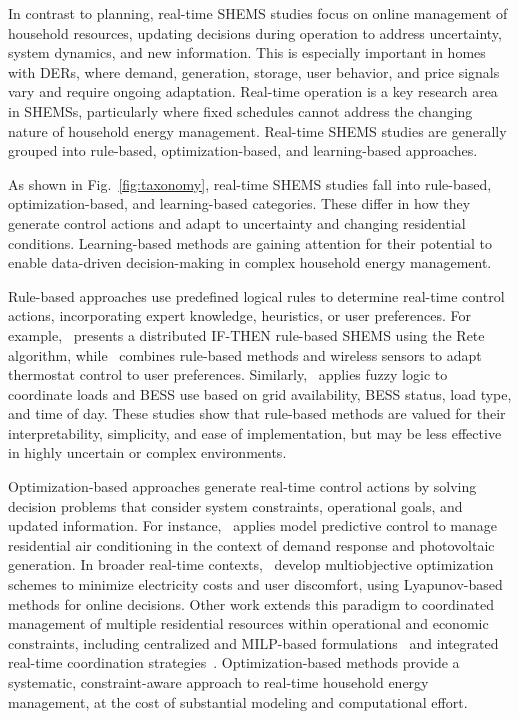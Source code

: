 \documentclass[preprint,12pt, 3p]{elsarticle}
\begin{document}
In contrast to planning, real-time \gls{SHEMS} studies focus on online management of household resources, updating decisions during operation to address uncertainty, system dynamics, and new information. This is especially important in homes with \glspl{DER}, where demand, generation, storage, user behavior, and price signals vary and require ongoing adaptation. Real-time operation is a key research area in \glspl{SHEMS}, particularly where fixed schedules cannot address the changing nature of household energy management. Real-time \gls{SHEMS} studies are generally grouped into rule-based, optimization-based, and learning-based approaches.

As shown in Fig.~\ref{fig:taxonomy}, real-time \gls{SHEMS} studies fall into rule-based, optimization-based, and learning-based categories. These differ in how they generate control actions and adapt to uncertainty and changing residential conditions. Learning-based methods are gaining attention for their potential to enable data-driven decision-making in complex household energy management.

Rule-based approaches use predefined logical rules to determine real-time control actions, incorporating expert knowledge, heuristics, or user preferences. For example,~\cite{kawakami2014evaluation-5b7} presents a distributed IF-THEN rule-based \gls{SHEMS} using the Rete algorithm, while~\cite{keshtkar2016adaptive-e08} combines rule-based methods and wireless sensors to adapt thermostat control to user preferences. Similarly,~\cite{krishna2018fuzzy-71b} applies fuzzy logic to coordinate loads and \gls{BESS} use based on grid availability, \gls{BESS} status, load type, and time of day. These studies show that rule-based methods are valued for their interpretability, simplicity, and ease of implementation, but may be less effective in highly uncertain or complex environments.

Optimization-based approaches generate real-time control actions by solving decision problems that consider system constraints, operational goals, and updated information. For instance,~\cite{godina2018model-dd4} applies model predictive control to manage residential air conditioning in the context of demand response and photovoltaic generation. In broader real-time contexts,~\cite{paul2020real-time-2b8,chatterjee2023multi-objective-ef1} develop multiobjective optimization schemes to minimize electricity costs and user discomfort, using Lyapunov-based methods for online decisions. Other work extends this paradigm to coordinated management of multiple residential resources within operational and economic constraints, including centralized and MILP-based formulations~\cite{seal2023centralized-90d,gomes2023milp-based-c2e} and integrated real-time coordination strategies~\cite{tifoura2025home-d26,teng2025integrating-1fd}. Optimization-based methods provide a systematic, constraint-aware approach to real-time household energy management, at the cost of substantial modeling and computational effort.
\end{document}
